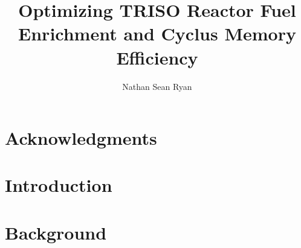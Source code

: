\documentclass[edeposit,fullpage]{uiucthesis2018}
\title{Optimizing TRISO Reactor Fuel Enrichment and Cyclus Memory Efficiency}
\author{Nathan Sean Ryan}
\begin{document}
\maketitle

\frontmatter
\begin{abstract}



\end{abstract}

\chapter*{Acknowledgments}




\tableofcontents
\listoftables
\listoffigures


\pagebreak
\mainmatter

\chapter{Introduction}
\label{ch:introduction}



% 

\chapter{Background}
\label{background}
\end{document}
